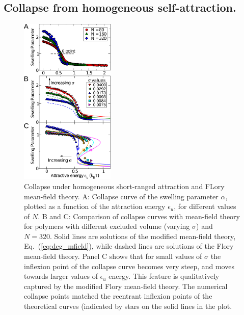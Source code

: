 \documentclass[
preprint,
a4paper,
12pt,
superscriptaddress,
pre]{revtex4}
\begin{document}

\subsection*{Collapse from homogeneous self-attraction. }


\begin{figure}
  \centering
  \includegraphics[width=0.4\textwidth]{fig2}
  \caption{Collapse under homogeneous short-ranged attraction and
    FLory mean-field theory. A: Collapse curve of the swelling parameter
    $\alpha$, plotted as a function of the attraction energy
    $\epsilon_u$, for different values of $N$. B and C: Comparison of
    collapse curves with mean-field theory for polymers with different
    excluded volume (varying $\sigma$) and $N=320$.  Solid lines are
    solutions of the modified mean-field theory,
    Eq.~(\ref{eq:deg_mfield}), while dashed lines are solutions of the
    Flory mean-field theory. Panel C shows that for small values of
    $\sigma$ the inflexion point of the collapse curve becomes very
    steep, and moves towards larger values of $\epsilon_u$
    energy. This feature is qualitatively captured by the modified Flory
    mean-field theory. The numerical collapse points
    matched the reentrant inflexion points of the theoretical curves
    (indicated by stars on the solid lines in the plot.  }
  \label{fig:2}
\end{figure}
\end{document}
